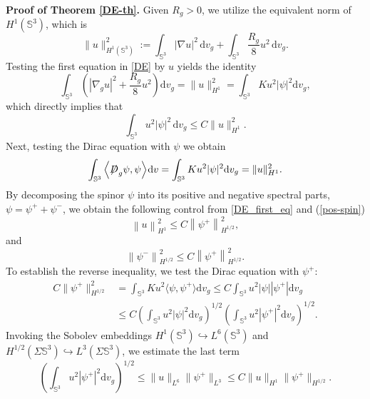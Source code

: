 \documentclass[a4paper, 12pt]{article}
\def\slashiii#1{\setbox0=\hbox{$#1$}#1\hskip-\wd0\hbox to\wd0{\hss\sl/\/\hss}}
\begin{document}
\

\noindent\textbf{Proof of Theorem \ref{DE-th}.} Given $R_g>0$, we utilize the equivalent norm of ${H^1(\mathbb{S}^3)}$, which is
\[
\|u\|_{H^1(\mathbb{S}^3)}^2 := \int_{\mathbb{S}^3} |\nabla u|^2 \, \text{d}v_g + \int_{\mathbb{S}^3} \frac{R_g}{8} u^2 \, \text{d}v_g.
\]
Testing the first equation in \eqref{DE} by $u$ yields the identity
\begin{equation}\label{DE_first_eq}
	\int_{\mathbb{S}^3} \left( |\nabla_g u|^2 + \frac{R_g}{8} u^2 \right)\text{d}v_g = \|u\|_{H^1}^2 = \int_{\mathbb{S}^3} K u^2 |\psi|^2\text{d}v_g,
\end{equation}
which directly implies that
\begin{equation}\label{3-coup}
	\int_{\mathbb{S}^3} u^2 |\psi|^2 \, \text{d}v_g \leq C \|u\|_{H^1}^2.
\end{equation}
Next, testing the Dirac equation with $\psi$ we obtain
\[ \int_{{\mathbb{S}^3}} {\left\langle {{\slashiii{D}_g}\psi ,\psi } \right\rangle } {\mkern 1mu} {\text{d}}v= \int_{\mathbb{S}^3} K u^2 |\psi|^2 \text{d}v_g= \|u\|_{H^1}^2. \]
By decomposing the spinor $\psi$ into its positive and negative spectral parts, $\psi = \psi^+ + \psi^-$, we obtain the following control from \eqref{DE_first_eq} and (\ref{pos-spin})
\begin{equation}\label{u-psi}
	\left\| u \right\|_{{H^1}}^2 \leq C\left\| {{\psi ^ + }} \right\|_{{H^{1/2}}}^2,
\end{equation}
and
\begin{equation}\label{psi-psi}
	\left\| {{\psi ^ - }} \right\|_{{H^{1/2}}}^2 \leq C\left\| {{\psi ^ + }} \right\|_{{H^{1/2}}}^2.
\end{equation}			
To establish the reverse inequality, we test the Dirac equation with $\psi^+$:
\[
\begin{aligned}
	C \|\psi^+\|^2_{H^{1/2}} &= \int_{\mathbb{S}^3} K u^2 \langle \psi, \psi^+ \rangle \text{d}v_g\leq C \int_{\mathbb{S}^3} u^2 |\psi| |\psi^+| \text{d}v_g\\
	&\leq C \left( \int_{\mathbb{S}^3} u^2 |\psi|^2 \text{d}v_g\right)^{1/2} \left( \int_{\mathbb{S}^3} u^2 |\psi^+|^2\text{d}v_g \right)^{1/2}.
\end{aligned}
\]
Invoking the Sobolev embeddings $H^1(\mathbb{S}^3) \hookrightarrow L^6(\mathbb{S}^3)$ and $H^{1/2}(\Sigma\mathbb{S}^3) \hookrightarrow L^3(\Sigma\mathbb{S}^3)$, we estimate the last term
\[ \left( \int_{\mathbb{S}^3} u^2 |\psi^+|^2 \text{d}v_g\right)^{1/2} \leq \|u\|_{L^6} \|\psi^+\|_{L^3} \leq C \|u\|_{H^1} \|\psi^+\|_{H^{1/2}}. \]
\end{document}
